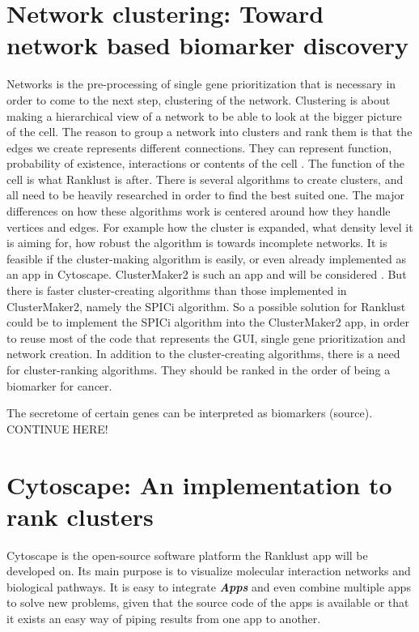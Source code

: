 \documentclass[UKenglish]{ifimaster}
\begin{document}
\chapter{Network clustering: Toward network based biomarker discovery}
Networks is the pre-processing of single gene prioritization that is necessary
in order to come to the next step, clustering of the network. Clustering is
about making a hierarchical view of a network to be able to look at the bigger
picture of the cell. The reason to group a network into clusters and rank them
is that the edges we create represents different connections. They can represent
function, probability of existence, interactions or contents of the cell
\cite{siri}. The function of the cell is what Ranklust is after. There is
several algorithms to create clusters, and all need to be heavily researched in
order to find the best suited one. The major differences on how these algorithms
work is centered around how they handle vertices and edges. For example how the
cluster is expanded, what density level it is aiming for, how robust the
algorithm is towards incomplete networks. It is feasible if the cluster-making
algorithm is easily, or even already implemented as an app in Cytoscape.
ClusterMaker2 is such an app and will be considered \cite{cm2}. But there is
faster cluster-creating algorithms than those implemented in ClusterMaker2,
namely the SPICi \cite{spici} algorithm. So a possible solution for Ranklust
could be to implement the SPICi algorithm into the ClusterMaker2 app, in order
to reuse most of the code that represents the GUI, single gene prioritization
and network creation. In addition to the cluster-creating algorithms, there is a
need for cluster-ranking algorithms. They should be ranked in the order of being
a biomarker for cancer.


The secretome of certain genes can be interpreted as biomarkers (source).
CONTINUE HERE!

\chapter{Cytoscape: An implementation to rank clusters}
Cytoscape is the open-source software platform the Ranklust app will be
developed on. Its main purpose is to visualize molecular interaction networks
and biological pathways.  It is easy to integrate \textbf{\textit{Apps}} and
even combine multiple apps to solve new problems, given that the source code of
the apps is available or that it exists an easy way of piping results from one
app to another. 
\end{document}

